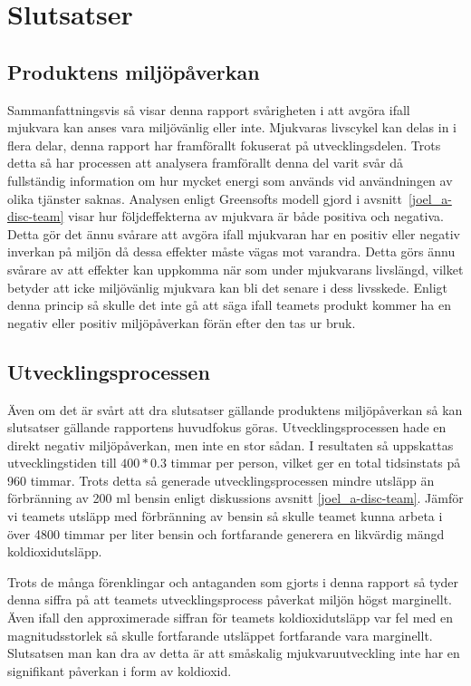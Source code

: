 \section{Slutsatser}
\label{sec:joel_a-conclusion}

\subsection{Produktens miljöpåverkan}
Sammanfattningsvis så visar denna rapport svårigheten i att avgöra ifall mjukvara kan anses vara miljövänlig eller inte. Mjukvaras livscykel kan delas in i flera delar, denna rapport har framförallt fokuserat på utvecklingsdelen. Trots detta så har processen att analysera framförallt denna del varit svår då fullständig information om hur mycket energi som används vid användningen av olika tjänster saknas. Analysen enligt Greensofts modell gjord i avsnitt~\ref{joel_a-disc-team} visar hur följdeffekterna av mjukvara är både positiva och negativa. Detta gör det ännu svårare att avgöra ifall mjukvaran har en positiv eller negativ inverkan på miljön då dessa effekter måste vägas mot varandra. Detta görs ännu svårare av att effekter kan uppkomma när som under mjukvarans livslängd, vilket betyder att icke miljövänlig mjukvara kan bli det senare i dess livsskede. Enligt denna princip så skulle det inte gå att säga ifall teamets produkt kommer ha en negativ eller positiv miljöpåverkan förän efter den tas ur bruk.

\subsection{Utvecklingsprocessen}
Även om det är svårt att dra slutsatser gällande produktens miljöpåverkan så kan slutsatser gällande rapportens huvudfokus göras. Utvecklingsprocessen hade en direkt negativ miljöpåverkan, men inte en stor sådan. I resultaten så uppskattas utvecklingstiden till $400 * 0.3$ timmar per person, vilket ger en total tidsinstats på 960 timmar. Trots detta så generade utvecklingsprocessen mindre utsläpp än förbränning av 200 ml bensin enligt diskussions avsnitt \ref{joel_a-disc-team}. Jämför vi teamets utsläpp med förbränning av bensin så skulle teamet kunna arbeta i över 4800 timmar per liter bensin och fortfarande generera en likvärdig mängd koldioxidutsläpp.

Trots de många förenklingar och antaganden som gjorts i denna rapport så tyder denna siffra på att teamets utvecklingsprocess påverkat miljön högst marginellt. Även ifall den approximerade siffran för teamets koldioxidutsläpp var fel med en magnitudsstorlek så skulle fortfarande utsläppet fortfarande vara marginellt. Slutsatsen man kan dra av detta är att småskalig mjukvaruutveckling inte har en signifikant påverkan i form av koldioxid.

